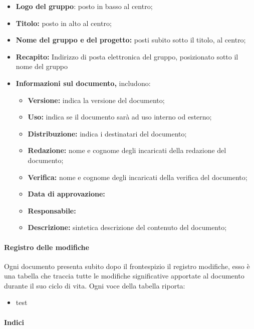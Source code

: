 \begin{itemize}

	\item \textbf{Logo del gruppo}: posto in basso al centro;
	\item \textbf{Titolo:} posto in alto al centro;
	\item \textbf{Nome del gruppo e del progetto:} posti subito sotto il titolo, al centro;
	\item \textbf{Recapito:} Indirizzo di posta elettronica del gruppo, posizionato sotto il nome del gruppo
	\item \textbf{Informazioni sul documento,} includono:
	
	\begin{itemize}
		\item \textbf{Versione:} indica la versione del documento;
		\item \textbf{Uso:} indica se il documento sarà ad uso interno od esterno;
		\item \textbf{Distribuzione:} indica i destinatari del documento;
		\item \textbf{Redazione:} nome e cognome degli incaricati della redazione del documento;
		\item \textbf{Verifica:} nome e cognome degli incaricati della verifica del documento;
		\item \textbf{Data di approvazione:}
		\item \textbf{Responsabile:}
		\item \textbf{Descrizione:} sintetica descrizione del contenuto del documento;
	\end{itemize}

\end{itemize}

\paragraph{Registro delle modifiche}

Ogni documento presenta subito dopo il frontespizio il registro modifiche, esso è una tabella che traccia tutte le modifiche significative apportate al documento durante il suo ciclo di vita. Ogni voce della tabella riporta:

\begin{itemize}
	\item test
\end{itemize}

\paragraph{Indici}

